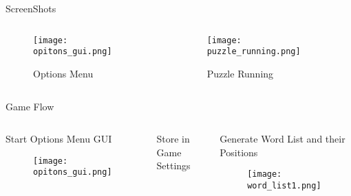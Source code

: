 \documentclass[handout]{beamer}%
\begin{document}
\begin{frame}{ScreenShots}
\begin{columns}[c]
\begin{column}{4cm}
\begin{figure}
\texttt{[image: opitons\_gui.png]}
\caption{Options Menu}
\end{figure}

\end{column}
\begin{column}{6cm}

\begin{figure}
\texttt{[image: puzzle\_running.png]}
\caption{Puzzle Running}
\end{figure}
\end{column}
\end{columns}
\end{frame}

\begin{frame}{Game Flow}
\begin{columns}[c]
\begin{column}{4cm}
\begin{tcolorbox}[colback=blue!5,colframe=blue!50!black,title=1]
\centering Start Options Menu GUI
\end{tcolorbox}
\pause
\begin{figure}
\texttt{[image: opitons\_gui.png]}
\end{figure}
\end{column}
\pause
\begin{column}[b]{3cm}
\begin{tcolorbox}[colback=blue!5,colframe=blue!50!black, title=2]
\centering Store in \\Game Settings
\end{tcolorbox}

\end{column}
\pause
\begin{column}{3cm}
\begin{tcolorbox}[colback=blue!5,colframe=blue!50!black, title=3]
\centering Generate Word List and their Positions
\end{tcolorbox}
\pause
\begin{figure}
\texttt{[image: word\_list1.png]}
\end{figure}
\end{column}

\end{columns}
\end{frame}
\end{document}
